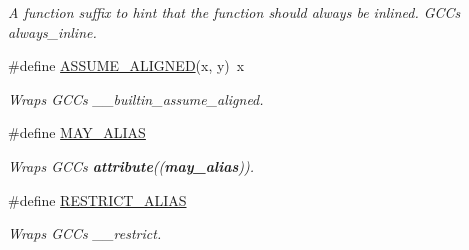 \begin{DoxyCompactItemize}
\begin{DoxyCompactList}\small\item\em A function suffix to hint that the function should always be inlined. G\+CC\textquotesingle{}s always\+\_\+inline. \end{DoxyCompactList}\item 
\#define \hyperlink{group__COMPILER_gae36a71bd5471dacafdfc44648ab7fd2b}{A\+S\+S\+U\+M\+E\+\_\+\+A\+L\+I\+G\+N\+ED}(x,  y)~x\hypertarget{group__COMPILER_gae36a71bd5471dacafdfc44648ab7fd2b}{}\label{group__COMPILER_gae36a71bd5471dacafdfc44648ab7fd2b}

\begin{DoxyCompactList}\small\item\em Wraps G\+CC\textquotesingle{}s \+\_\+\+\_\+builtin\+\_\+assume\+\_\+aligned. \end{DoxyCompactList}\item 
\#define \hyperlink{group__COMPILER_ga6747712d26181b3a549cb55a69c3f4cb}{M\+A\+Y\+\_\+\+A\+L\+I\+AS}
\begin{DoxyCompactList}\small\item\em Wraps G\+CC\textquotesingle{}s {\bfseries attribute}(({\bfseries may\+\_\+alias})). \end{DoxyCompactList}\item 
\#define \hyperlink{group__COMPILER_ga6decd303d90f9cd75d6bb79d51ea2154}{R\+E\+S\+T\+R\+I\+C\+T\+\_\+\+A\+L\+I\+AS}
\begin{DoxyCompactList}\small\item\em Wraps G\+CC\textquotesingle{}s \+\_\+\+\_\+restrict. \end{DoxyCompactList}\end{DoxyCompactItemize}


